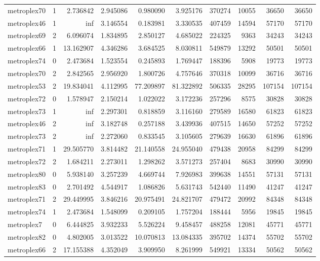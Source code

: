 \begin{longtable}{|l|r|r|r|r|r|r|r|r|r|}
metroplex70 & 1 & 2.736842 & 2.945086 & 0.980090 & 3.925176 & 370274 & 10055 & 36650 & 36650 \\
metroplex46 & 1 & inf & 3.146554 & 0.183981 & 3.330535 & 407459 & 14594 & 57170 & 57170 \\
metroplex69 & 2 & 6.096074 & 1.834895 & 2.850127 & 4.685022 & 224325 & 9363 & 34243 & 34243 \\
metroplex66 & 1 & 13.162907 & 4.346286 & 3.684525 & 8.030811 & 549879 & 13292 & 50501 & 50501 \\
metroplex74 & 0 & 2.473684 & 1.523554 & 0.245893 & 1.769447 & 188396 & 5908 & 19773 & 19773 \\
metroplex70 & 2 & 2.842565 & 2.956920 & 1.800726 & 4.757646 & 370318 & 10099 & 36716 & 36716 \\
metroplex53 & 2 & 19.834041 & 4.112995 & 77.209897 & 81.322892 & 506335 & 28295 & 107154 & 107154 \\
metroplex72 & 0 & 1.578947 & 2.150214 & 1.022022 & 3.172236 & 257296 & 8575 & 30828 & 30828 \\
metroplex73 & 1 & inf & 2.297301 & 0.818859 & 3.116160 & 279589 & 16580 & 61823 & 61823 \\
metroplex46 & 2 & inf & 3.182748 & 0.257188 & 3.439936 & 407515 & 14650 & 57252 & 57252 \\
metroplex73 & 2 & inf & 2.272060 & 0.833545 & 3.105605 & 279639 & 16630 & 61896 & 61896 \\
metroplex71 & 1 & 29.505770 & 3.814482 & 21.140558 & 24.955040 & 479438 & 20958 & 84299 & 84299 \\
metroplex72 & 2 & 1.684211 & 2.273011 & 1.298262 & 3.571273 & 257404 & 8683 & 30990 & 30990 \\
metroplex80 & 0 & 5.938140 & 3.257239 & 4.669744 & 7.926983 & 399638 & 14551 & 57131 & 57131 \\
metroplex83 & 0 & 2.701492 & 4.544917 & 1.086826 & 5.631743 & 542440 & 11490 & 41247 & 41247 \\
metroplex71 & 2 & 29.449995 & 3.846216 & 20.975491 & 24.821707 & 479472 & 20992 & 84348 & 84348 \\
metroplex74 & 1 & 2.473684 & 1.548099 & 0.209105 & 1.757204 & 188444 & 5956 & 19845 & 19845 \\
metroplex7 & 0 & 6.444825 & 3.932233 & 5.526224 & 9.458457 & 488258 & 12081 & 45771 & 45771 \\
metroplex82 & 0 & 4.802005 & 3.013522 & 10.070813 & 13.084335 & 395702 & 14374 & 55702 & 55702 \\
metroplex66 & 2 & 17.155388 & 4.352049 & 3.909950 & 8.261999 & 549921 & 13334 & 50562 & 50562 \\

\end{longtable}
